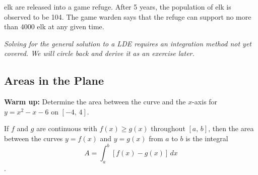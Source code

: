 \documentclass[addpoints, 12pt]{exam}
\begin{document}
\begin{questions}
    \setcounter{question}{1}
     elk are released into a game refuge. After 5 years, the population of elk is observed to be 104. The game warden says that the refuge can support no more than 4000 elk at any given time.
\end{questions}


\textit{\footnotesize Solving for the general solution to a LDE requires an integration method not yet covered. We will circle back and derive it as an exercise later.}



\newpage
{}
\subsection*{Areas in the Plane}
\textbf{Warm up:} Determine the area between the curve and the $x$-axis for $y=x^2-x-6$ on $[-4,\,4].$

\begin{tcolorbox}[title= AREA IN THE PLANE, black,sharp corners,colback=white,colbacktitle=white,coltitle=black,boxrule=1pt]

     If $f$ and $g$ are continuous with $f(x)\ge g(x)$ throughout $[a,\,b]$, then the area between the curves $y=f(x)$ and $y=g(x)$ from $a$ to $b$ is the integral
     \[A=\int_a^b\left[f(x)-g(x)\right]\,dx\].
    
\end{tcolorbox}
\end{document}
